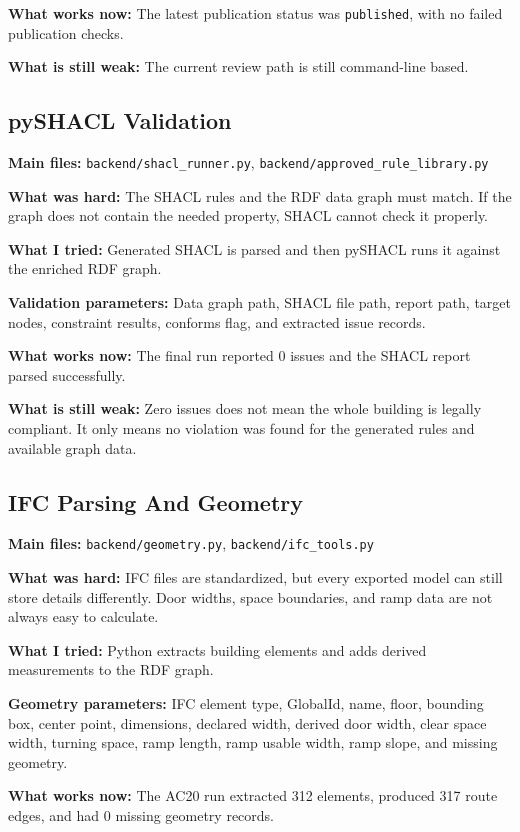 \documentclass[11pt,a4paper]{article}
\begin{document}
\textbf{What works now:}
The latest publication status was \texttt{published}, with no failed publication checks.

\textbf{What is still weak:}
The current review path is still command-line based.

\subsection{pySHACL Validation}
\textbf{Main files:} \texttt{backend/shacl\_runner.py}, \texttt{backend/approved\_rule\_library.py}

\textbf{What was hard:}
The SHACL rules and the RDF data graph must match. If the graph does not contain the needed property, SHACL cannot check it properly.

\textbf{What I tried:}
Generated SHACL is parsed and then pySHACL runs it against the enriched RDF graph.

\textbf{Validation parameters:}
Data graph path, SHACL file path, report path, target nodes, constraint results, conforms flag, and extracted issue records.

\textbf{What works now:}
The final run reported 0 issues and the SHACL report parsed successfully.

\textbf{What is still weak:}
Zero issues does not mean the whole building is legally compliant. It only means no violation was found for the generated rules and available graph data.

\subsection{IFC Parsing And Geometry}
\textbf{Main files:} \texttt{backend/geometry.py}, \texttt{backend/ifc\_tools.py}

\textbf{What was hard:}
IFC files are standardized, but every exported model can still store details differently. Door widths, space boundaries, and ramp data are not always easy to calculate.

\textbf{What I tried:}
Python extracts building elements and adds derived measurements to the RDF graph.

\textbf{Geometry parameters:}
IFC element type, GlobalId, name, floor, bounding box, center point, dimensions, declared width, derived door width, clear space width, turning space, ramp length, ramp usable width, ramp slope, and missing geometry.

\textbf{What works now:}
The AC20 run extracted 312 elements, produced 317 route edges, and had 0 missing geometry records.
\end{document}
